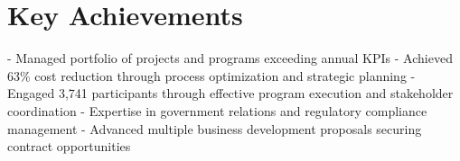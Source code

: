 \documentclass[a4paper,12pt]{article}
\begin{document}
\section{Key Achievements}
- Managed portfolio of projects and programs exceeding annual KPIs  
- Achieved 63\% cost reduction through process optimization and strategic planning  
- Engaged 3,741 participants through effective program execution and stakeholder coordination  
- Expertise in government relations and regulatory compliance management  
- Advanced multiple business development proposals securing contract opportunities

\end{document}
